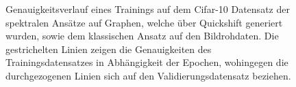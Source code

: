 \begin{figure}[t]
\begin{tikzpicture}[scale=1.4]
\end{tikzpicture}
\caption[\gls{Cifar}-10 Genauigkeitsverlauf über Quickshift]{Genauigkeitsverlauf eines Trainings auf dem \gls{Cifar}-10 Datensatz der spektralen Ansätze auf Graphen, welche über Quickshift generiert wurden, sowie dem klassischen Ansatz auf den Bildrohdaten.
Die gestrichelten Linien zeigen die Genauigkeiten des Trainingsdatensatzes in Abhängigkeit der Epochen, wohingegen die durchgezogenen Linien sich auf den Validierungsdatensatz beziehen.}
\label{fig:cifar_10_train}
\end{figure}
